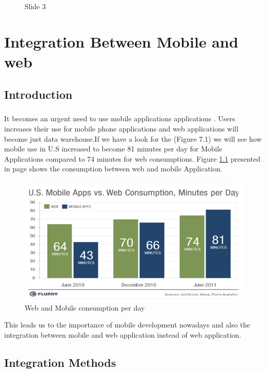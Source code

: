 \documentclass[12pt,a4paper,class,twoside,openany]{report}
\begin{document}
{\begin{figure}
\begin{minipage}[b]{0.5\linewidth}
	\caption{Slide 3}
	\label{fg:6-20}
	\end{minipage}
	\end{figure}

\cleardoublepage
\chapter{Integration Between Mobile and web }

\section{Introduction}
\paragraph*{\hspace{.9 cm} } It becomes an urgent need to use mobile applications applications . Users increases their use for mobile phone applications and web applications will become just data warehouse.If we have a look for the (Figure 7.1) we will see how mobile use in U.S increased to become 81 minutes per day for Mobile Applications compared to
74 minutes for web consumptions.
Figure \ref{fg:7-1} presented in page \pageref{fg:7-1}shows the consumption between web and mobile Application. 
\begin{figure}
\begin{center}
\includegraphics[height=2 in]{7-1}
\caption{Web and Mobile consumption per day}
\label{fg:7-1}
\end{center}
\end{figure}
This leads us to the importance of mobile development nowadays and also the integration between mobile and web application instead of web application.
\section{Integration Methods} 
}
\end{document}
